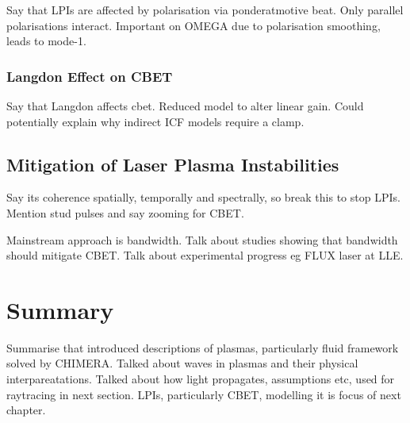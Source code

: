 Say that LPIs are affected by polarisation via ponderatmotive beat.
Only parallel polarisations interact.
Important on OMEGA due to polarisation smoothing, leads to mode-1.

\subsubsection{Langdon Effect on CBET}%
\label{sec:theory_cbet_langdon}

Say that Langdon affects cbet.
Reduced model to alter linear gain.
Could potentially explain why indirect ICF models require a clamp.

\subsection{Mitigation of Laser Plasma Instabilities}%
\label{sec:theory_lpi_mitigation}

Say its coherence spatially, temporally and spectrally, so break this to stop LPIs.
Mention stud pulses and say zooming for CBET.

Mainstream approach is bandwidth.
Talk about studies showing that bandwidth should mitigate CBET.
Talk about experimental progress eg FLUX laser at LLE.


\section{Summary}%
\label{sec:theory_summary}

Summarise that introduced descriptions of plasmas, particularly fluid framework solved by CHIMERA.
Talked about waves in plasmas and their physical interpareatations.
Talked about how light propagates, assumptions etc, used for raytracing in next section.
LPIs, particularly CBET, modelling it is focus of next chapter.
